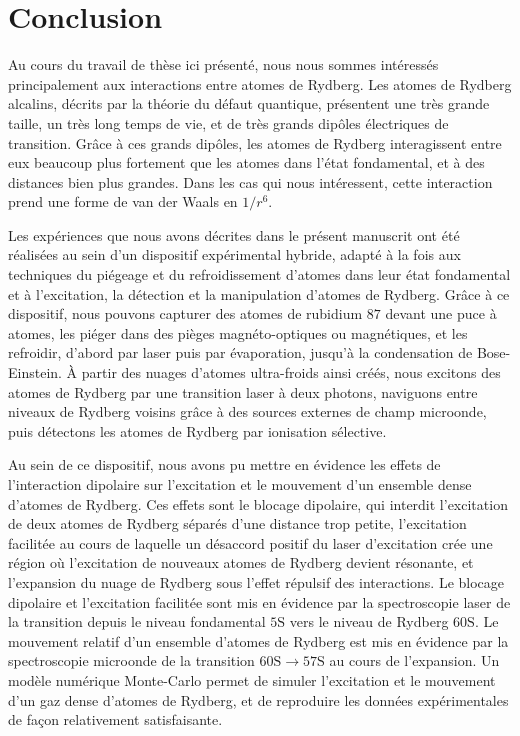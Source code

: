 \chapter*{Conclusion}\label{chapter:concl}
 \mtcaddchapter
{}
 
\noindent Au cours du travail de thèse ici présenté, nous nous sommes intéressés principalement aux interactions entre atomes de Rydberg.
Les atomes de Rydberg alcalins, décrits par la théorie du défaut quantique, présentent une très grande taille, un très long temps de vie, et de très grands dipôles électriques de transition.
Grâce à ces grands dipôles, les atomes de Rydberg interagissent entre eux beaucoup plus fortement que les atomes dans l'état fondamental, et à des distances bien plus grandes.
Dans les cas qui nous intéressent, cette interaction prend une forme de van der Waals en $1/r^6$.

Les expériences que nous avons décrites dans le présent manuscrit ont été réalisées au sein d'un dispositif expérimental hybride, adapté à la fois aux techniques du piégeage et du refroidissement d'atomes dans leur état fondamental et à l'excitation, la détection et la  manipulation d'atomes de Rydberg.
Grâce à ce dispositif, nous pouvons capturer des atomes de rubidium $87$ devant une puce à atomes, les piéger dans des pièges magnéto-optiques ou magnétiques, et les refroidir, d'abord par laser puis par évaporation, jusqu'à %
la condensation de Bose-Einstein.
\`A partir des nuages d'atomes ultra-froids ainsi créés, nous excitons des atomes de Rydberg par une transition laser à deux photons, naviguons entre niveaux de Rydberg voisins grâce à des sources externes de champ microonde, puis détectons les atomes de Rydberg par ionisation sélective.

Au sein de ce dispositif, nous avons pu mettre en évidence les effets de l'interaction dipolaire sur l'excitation et le mouvement d'un ensemble dense d'atomes de Rydberg.
Ces effets sont le blocage dipolaire, qui interdit l'excitation de deux atomes de Rydberg séparés d'une distance trop petite, l'excitation facilitée au cours de laquelle un désaccord positif du laser d'excitation crée une région où l'excitation de nouveaux atomes de Rydberg devient résonante, et l'expansion du nuage de Rydberg sous l'effet répulsif des interactions.
Le blocage dipolaire et l'excitation facilitée sont mis en évidence par la spectroscopie laser de la transition depuis le niveau fondamental $\mathrm{5S}$ vers le niveau de Rydberg $\mathrm{60S}$.
Le mouvement relatif d'un ensemble d'atomes de Rydberg est mis en évidence par la spectroscopie microonde de la transition $\mathrm{60S \rightarrow 57S}$ au cours de l'expansion.
Un modèle numérique Monte-Carlo permet de simuler l'excitation et le mouvement d'un gaz dense d'atomes de Rydberg, et de reproduire les données expérimentales de façon relativement satisfaisante.

